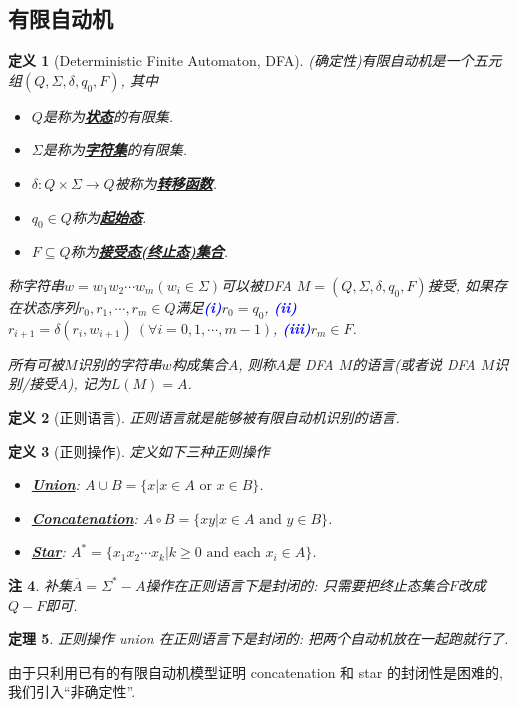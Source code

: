 \documentclass[8pt]{article}
\theoremstyle{compact}
\newtheorem{theorem}{定理}[section]
\newtheorem{definition}[theorem]{定义}
\newtheorem{remark}[theorem]{注}
\def\obj#1{\textbf{\uline{#1}}}
\def\num#1{\textnormal{\textbf{\mbox{\textcolor{blue}{(#1)}}}}}
\def\ge{\geqslant}
\begin{document}
\subsection{有限自动机}
\begin{definition}[Deterministic Finite Automaton, DFA]
	(确定性)有限自动机是一个五元组$(Q, \Sigma, \delta, q_0, F)$, 其中
	\begin{itemize}
		\item $Q$是称为\obj{状态}的有限集. 
		\item $\Sigma$是称为\obj{字符集}的有限集. 
		\item $\delta: Q \times \Sigma \to Q$被称为\obj{转移函数}. 
		\item $q_0 \in Q$称为\obj{起始态}. 
		\item $F \subseteq Q$称为\obj{接受态(终止态)集合}. 
	\end{itemize}

	称字符串$w = w_1w_2\cdots w_m(w_i \in \Sigma)$可以被DFA $M = (Q, \Sigma, \delta, q_0, F)$接受, 如果存在状态序列$r_0, r_1, \cdots, r_m \in Q$满足\num{i}$r_0 = q_0$, \num{ii}$r_{i+1} = \delta(r_i, w_{i+1}) \ (\forall i = 0, 1, \cdots, m-1)$, \num{iii}$r_m \in F$. 

	所有可被$M$识别的字符串$w$构成集合$A$, 则称$A$是 DFA $M$的语言(或者说 DFA $M$识别/接受$A$), 记为$L(M) = A$.
\end{definition}
\begin{definition}[正则语言]
	正则语言就是能够被有限自动机识别的语言. 
\end{definition}
\begin{definition}[正则操作]
	定义如下三种正则操作
	\begin{itemize}
		\item \obj{Union}: $A \cup B = \{x | x \in A \textrm{ or } x \in B\}$.
		\item \obj{Concatenation}: $A \circ B = \{xy | x \in A \textrm{ and } y \in B\}$.
		\item \obj{Star}: $A^* = \{x_1x_2\cdots x_k | k \ge 0 \textrm{ and each } x_i \in A\}$.
	\end{itemize}
\end{definition}
\begin{remark}
	补集$\overline{A} = \Sigma^* - A$操作在正则语言下是封闭的: 只需要把终止态集合$F$改成$Q - F$即可.
\end{remark}
\begin{theorem}
	正则操作 union 在正则语言下是封闭的: 把两个自动机放在一起跑就行了. 
\end{theorem}
由于只利用已有的有限自动机模型证明 concatenation 和 star 的封闭性是困难的, 我们引入“非确定性”. 
\end{document}
